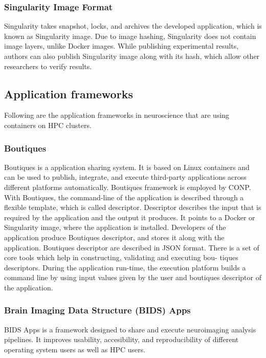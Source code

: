 \documentclass[a4paper,num-refs]{oup-contemporary}
\begin{document}
\subsubsection{Singularity Image Format}

Singularity takes snapshot, locks, and archives the developed application, which
is known as Singularity image. Due to image hashing, Singularity does not
contain image layers, unlike Docker images. While publishing experimental
results, authors can also publish Singularity image along with its hash, which
allow other researchers to verify results.

\subsection{Application frameworks}

Following are the application frameworks in neuroscience that are using containers
on HPC clusters.

\subsubsection{Boutiques}

Boutiques is a application sharing system. It is based on Linux containers
and can be used to publish, integrate, and execute third-party
applications across different platforms automatically. Boutiques framework is
employed by CONP. With Boutiques, the command-line of the application is
described through a flexible template, which is called descriptor. Descriptor
describes the input that is required by the application and the output it produces.
It points to a Docker or Singularity image, where the application is installed.
Developers of the application produce Boutiques descriptor, and stores it along
with the application. Boutiques descriptor are described in JSON format. There
is a set of core tools which help in constructing, validating and executing bou-
tiques descriptors. During the application run-time, the execution platform
builds a command line by using input values given by the user and boutiques
descriptor of the application.

\subsubsection{Brain Imaging Data Structure (BIDS) Apps}

BIDS Apps is a framework designed to share and execute neuroimaging
analysis pipelines. It improves usability, accesibility, and reproducibility
of different operating system users as well as HPC users.
\end{document}
